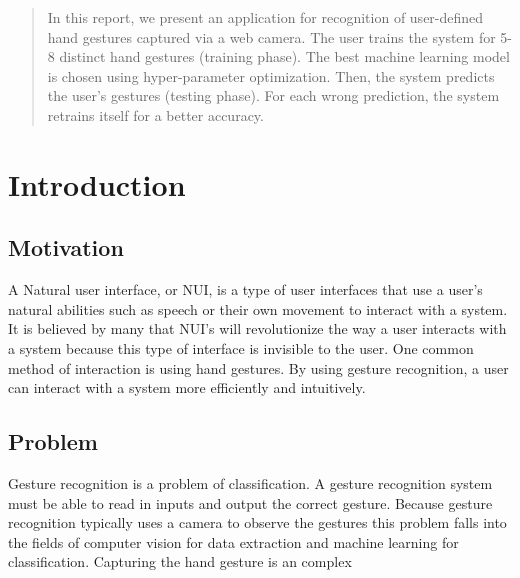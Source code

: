 \documentclass{article}
\begin{document}

\begin{abstract}
In this report, we present an application for recognition of user-defined hand gestures captured via a web camera. The user trains the system for 5-8 distinct hand gestures (training phase). The best machine learning model is chosen using hyper-parameter optimization. Then, the system predicts the user’s gestures (testing phase). For each wrong prediction, the system retrains itself for a better accuracy.
\end{abstract}

\section{Introduction}
\label{Intro}
\subsection{Motivation}
A Natural user interface, or NUI, is a type of user interfaces that use a user’s natural abilities such as speech or their own movement to interact with a system. It is believed by many that NUI's will revolutionize the way a user interacts with a system because this type of interface is invisible to the user. One common method of interaction is using hand gestures. By using gesture recognition, a user can interact with a system more efficiently and intuitively.
\subsection{Problem}
Gesture recognition is a problem of classification. A gesture recognition system must be able to read in inputs and output the correct gesture. Because gesture recognition typically uses a camera to observe the gestures this problem falls into the fields of computer vision for data extraction and machine learning for classification. Capturing the hand gesture is an complex\
\end{document}

